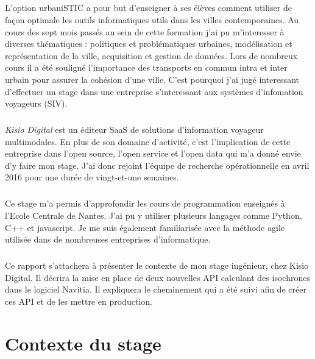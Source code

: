 \documentclass[a4paper]{report}
\begin{document}
\paragraph{} L'option urbaniSTIC a pour but d'enseigner à ses élèves comment utiliser de façon optimale les outils informatiques utils dans les villes contemporaines. Au cours des sept mois passés au sein de cette formation j'ai pu m'interesser à diverses thématiques : politiques et problématiques urbaines, modélisation et représentation de la ville, acquisition et gestion de données. Lors de nombreux cours il a été souligné l'importance des transports en commun intra et inter urbain pour assurer la cohésion d'une ville. C'est pourquoi j'ai jugé interessant d'effectuer un stage dans une entreprise s'interessant aux systèmes d'infomation voyageurs (SIV).

\paragraph{} \emph{Kisio Digital} est un éditeur SaaS de solutions d’information voyageur multimodales. En plus de son domaine d'activité, c'est l'implication de cette entreprise dans l'open source, l'open service et l'open data qui m'a donné envie d'y faire mon stage. J'ai donc rejoint l'équipe de recherche opérationnelle en avril 2016 pour une durée de vingt-et-une semaines.

\paragraph{} Ce stage m'a permis d'approfondir les cours de programmation enseignés à l'Ecole Centrale de Nantes. J'ai pu y utiliser plusieurs langages comme Python, C++ et javascript. Je me suis également familiarisée avec la méthode agile utilisée dans de nombreuses entreprises d'informatique. 

\paragraph{} Ce rapport s’attachera  à présenter le contexte de mon stage ingénieur, chez Kisio Digital. Il décrira la mise en place de deux nouvelles API calculant des isochrones dans le logiciel Navitia. Il expliquera le cheminement qui a été suivi afin de créer ces API et de les mettre en production.

\chapter{Contexte du stage}
\end{document}
